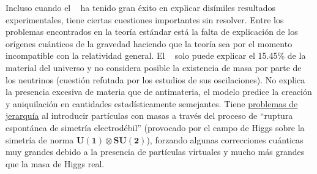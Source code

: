Incluso cuando el \ME ~ ha tenido gran éxito en explicar disímiles resultados experimentales,  tiene ciertas cuestiones importantes sin resolver. Entre los problemas encontrados en la teoría estándar está la falta de explicación de los orígenes cuánticos de la gravedad haciendo que la teoría sea por el momento incompatible con la relatividad general. El \ME ~ solo puede explicar el 15.45\% de la material del universo y no considera posible la existencia de masa por parte de los neutrinos (cuestión refutada por los estudios de sus oscilaciones). No explica la presencia excesiva de materia que de antimateria, el modelo predice la creación y aniquilación en cantidades estadísticamente semejantes. Tiene \href{https://en.wikipedia.org/wiki/Hierarchy_problem}{problemas de jerarquía} al introducir partículas con masas a través del proceso de ``ruptura espontánea de simetría electrodébil'' (provocado por el campo de Higgs sobre la simetría de norma $\mathbf{U(1) \otimes SU(2)}$), forzando algunas correcciones cuánticas muy grandes debido a la presencia de partículas virtuales y mucho más grandes que la masa de Higgs real.





